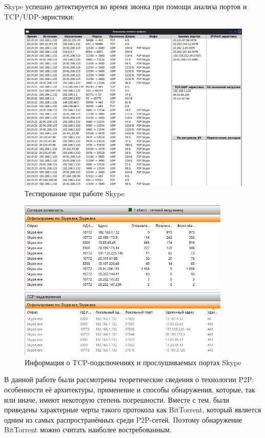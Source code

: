 \documentclass[bachelor, och, coursework]{SCWorks}
\begin{document}
Skype успешно детектируется во время звонка при помощи анализа портов и TCP/UDP-эвристики:
\begin{figure}[H]
    \centering
    \includegraphics[width=1\textwidth]{test5.png}
    \caption{Тестирование при работе Skype}
\end{figure}

\begin{figure}[H]
    \centering
    \includegraphics[width=0.9\textwidth]{test5_resmon.png}
    \caption{Информация о TCP-подключениях и прослушиваемых портах Skype}
    \label{test5_resmon}
\end{figure}

\conclusion
В данной работе были рассмотрены теоретические сведения о технологии P2P: особенности её архитектуры, применение
и способы обнаружения, которые, так или иначе, имеют некоторую степень погрешности. Вместе с тем, были приведены характерные черты такого протокола как BitTorrent, который является одним из самых распространённых среди P2P-сетей.
Поэтому обнаружение BitTorrent можно считать наиболее востребованным.
\end{document}

